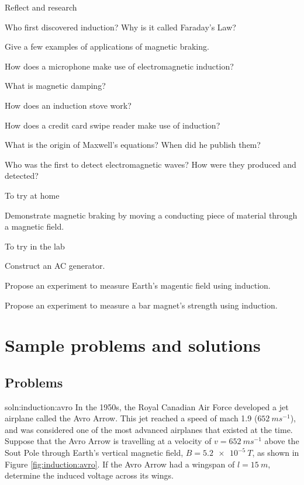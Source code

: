 \begin{chapteractivity}{Reflect and research}
{
\item Who first discovered induction? Why is it called Faraday's Law?
\item Give a few examples of applications of magnetic braking.
\item How does a microphone make use of electromagnetic induction?
\item What is magnetic damping?
\item How does an induction stove work?
\item How does a credit card swipe reader make use of induction?
\item What is the origin of Maxwell's equations? When did he publish them?
\item Who was the first to detect electromagnetic waves? How were they produced and detected?
}
\end{chapteractivity}
\begin{chapteractivity}{To try at home}
{
\item Demonstrate magnetic braking by moving a conducting piece of material through a magnetic field.
}
\end{chapteractivity}
\begin{chapteractivity}{To try in the lab}
{
\item Construct an AC generator.
\item Propose an experiment to measure Earth's magentic field using induction.
\item Propose an experiment to measure a bar magnet's strength using induction.
}
\end{chapteractivity}

\newpage
\section{Sample problems and solutions}
\subsection{Problems}
\begin{problem}{soln:induction:avro}{\label{prob:induction:avro} 
In the 1950s, the Royal Canadian Air Force developed a jet airplane called the Avro Arrow. This jet reached a speed of mach 1.9 ($\SI{652}{ms^{-1}}$), and was considered one of the most advanced airplanes that existed at the time. Suppose that the Avro Arrow is travelling at a velocity of $v = \SI{652}{ms^{-1}}$ above the Sout Pole through Earth's vertical magnetic field, $B = \SI{5.2e-5}{T}$, as shown in Figure \ref{fig:induction:avro}. If the Avro Arrow had a wingspan of $l = \SI{15}{m}$, determine the induced voltage across its wings.
}
\end{problem}


